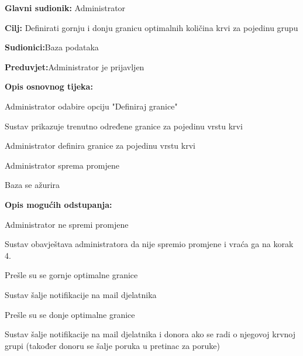 \begin{packed_item}
	
	\item \textbf{Glavni sudionik: }{Administrator}
	\item  \textbf{Cilj:} {Definirati gornju i donju granicu optimalnih količina krvi za pojedinu grupu}
	\item  \textbf{Sudionici:}{Baza podataka}
	\item  \textbf{Preduvjet:}{Administrator je prijavljen}
	\item  \textbf{Opis osnovnog tijeka:}
	
	\item[] \begin{packed_enum}
		
		\item {Administrator odabire opciju "Definiraj granice"}
		\item {Sustav prikazuje trenutno određene granice za pojedinu vrstu krvi} 
		\item {Administrator definira granice za pojedinu vrstu krvi}
		\item {Administrator sprema promjene}
		\item {Baza se ažurira}
		\end{packed_enum}
	\item  \textbf{Opis mogućih odstupanja:}
	
		\item[] \begin{packed_item}
		
			\item[4.a] {Administrator ne spremi promjene}
				\item[] \begin{packed_enum}
			
				\item Sustav obavještava administratora da nije spremio promjene i vraća ga na korak 4. 
				\end{packed_enum}
			\item[4.b] {Prešle su se gornje optimalne granice}	
				\item[] \begin{packed_enum}
			
				\item Sustav šalje notifikacije na mail djelatnika			
				\end{packed_enum}
			\item[4.c] {Prešle su se donje optimalne granice}	
				\item[] \begin{packed_enum}
			
				\item Sustav šalje notifikacije na mail djelatnika i donora ako se radi o njegovoj krvnoj grupi (također donoru se šalje poruka u pretinac za poruke)
				\end{packed_enum}
		
		
			\end{packed_item}
\end{packed_item}

